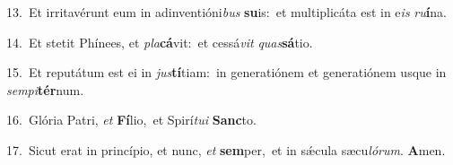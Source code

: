 {\numbfont\textcolor{\numbcolor}{13.}}~Et irritavérunt eum in adinventióni\textit{bus} \textbf{su}\-is:~\star et multiplicáta est in e\textit{is} \textit{ru}\-\textbf{í}na.\par
{\numbfont\textcolor{\numbcolor}{14.}}~Et stetit Phínees, et \textit{pla}\-\textbf{cá}vit:~\star et cessá\textit{vit} \textit{quas}\-\textbf{sá}tio.\par
{\numbfont\textcolor{\numbcolor}{15.}}~Et reputátum est ei in \textit{jus}\-\textbf{tí}tiam:~\star in generatiónem et generatiónem usque in \textit{sem}\-\textit{pi}\textbf{tér}num.\par
{\numbfont\textcolor{\numbcolor}{16.}}~Glória Patri, \textit{et} \textbf{Fí}\-lio,~\star et Spirí\-\textit{tu}\-\textit{i} \textbf{Sanc}\-to.\par
{\numbfont\textcolor{\numbcolor}{17.}}~Sicut erat in princípio, et nunc, \textit{et} \textbf{sem}\-per,~\star et in sǽcula sæcu\-\textit{ló}\-\textit{rum}. \textbf{A}\-men.\par
